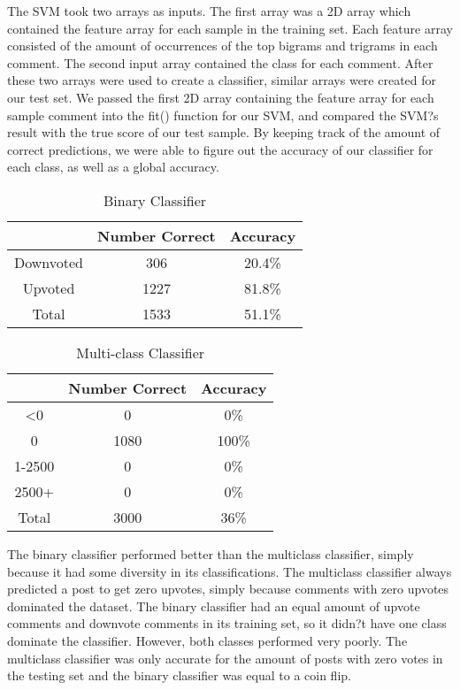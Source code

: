 \documentclass{article}
\begin{document}
The SVM took two arrays as inputs. The first array was a 2D array which contained the feature array for each sample in the training set. Each feature array consisted of the amount of occurrences of the top bigrams and trigrams in each comment. The second input array contained the class for each comment.  After these two arrays were used to create a classifier, similar arrays were created for our test set. We passed the first 2D array containing the feature array for each sample comment into the fit() function for our SVM, and compared the SVM?s result with the true score of our test sample. By keeping track of the amount of correct predictions, we were able to figure out the accuracy of our classifier for each class, as well as a global accuracy.\begin{table}[h]
\centering
\caption{Binary Classifier}
\begin{tabular}{|| c c c||}
\hline
& Number Correct & Accuracy\\
\hline\hline
Downvoted & 306 & 20.4\%\\
Upvoted & 1227 & 81.8\%\\
Total & 1533 & 51.1\% \\
\hline
\end{tabular}
\end{table}


\begin{table}[h]
\centering
\caption{Multi-class Classifier}
\begin{tabular}{|| c c c||}
\hline
& Number Correct & Accuracy\\
\hline\hline
\textless 0 & 0 & 0\%\\
0 & 1080 & 100\%\\
1-2500 & 0 & 0\%\\
2500+ & 0 & 0\%\\
Total & 3000 & 36\%\\
\hline
\end{tabular}
\end{table}

The binary classifier performed better than the multiclass classifier, simply because it had some diversity in its classifications. The multiclass classifier always predicted a post to get zero upvotes, simply because comments with zero upvotes dominated the dataset. The binary classifier had an equal amount of upvote comments and downvote comments in its training set, so it didn?t have one class dominate the classifier. However, both classes performed very poorly. The multiclass classifier was only accurate for the amount of posts with zero votes in the testing set and the binary classifier was equal to a coin flip. 
\end{document}
